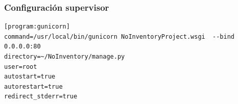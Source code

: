 \documentclass[a4paper,11pt]{book}
\begin{document}
\subsection{Configuración supervisor}\label{sec:supervisor}
\begin{lstlisting}
[program:gunicorn]
command=/usr/local/bin/gunicorn NoInventoryProject.wsgi  --bind 0.0.0.0:80
directory=~/NoInventory/manage.py
user=root
autostart=true
autorestart=true
redirect_stderr=true
\end{lstlisting}



%
%
%
%
%
%
%
%
%
%
%
%
%
%
%
%
%
%
%
%
%
\chapter*{}
\thispagestyle{empty}
\end{document}
